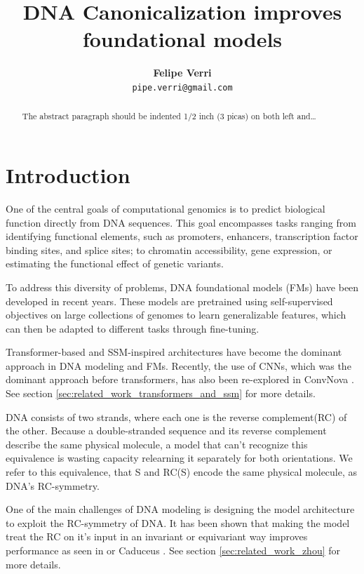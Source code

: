 \documentclass[   ]{article}
\title{DNA Canonicalization improves foundational models}
\author{
    \textbf{Felipe Verri} \\
    \texttt{pipe.verri@gmail.com}\\
    }
\begin{document}
\maketitle

\begin{abstract}
The abstract paragraph should be indented 1/2 inch (3 picas) on both
left and\ldots{}
\end{abstract}

\section{Introduction}\label{introduction}

One of the central goals of computational genomics is to predict
biological function directly from DNA sequences. This goal encompasses
tasks ranging from identifying functional elements, such as
promoters, enhancers, transcription factor binding sites, and splice
sites; to chromatin accessibility, gene expression, or estimating the
functional effect of genetic variants.

To address this diversity of problems, DNA foundational models (FMs)
have been developed in recent years. These models are pretrained using
self-supervised objectives on large collections of genomes to learn
generalizable features, which can then be adapted to different tasks
through fine-tuning.

Transformer-based and SSM-inspired architectures have become the dominant approach in DNA modeling and FMs. Recently, the use of CNNs, which was the dominant approach before transformers, has also been re-explored in ConvNova \citep{boRevisitingConvolutionArchitecture2025}. See section \ref{sec:related_work_transformers_and_ssm} for more details.

DNA consists of two strands, where each one is the reverse complement(RC) of the other. Because a double-stranded sequence and its reverse complement describe the same physical molecule, a model that can't recognize this equivalence is wasting capacity relearning it separately for both orientations. We refer to this equivalence, that S and RC(S) encode the same physical molecule, as DNA's RC-symmetry.

One of the main challenges of DNA modeling is designing the model architecture to exploit the RC-symmetry of DNA. It has been shown that making the model treat the RC on it's input in an invariant or equivariant way improves performance as seen in \citet{zhouBetterUnderstandingReverseComplement2021} or Caduceus \citep{schiffCaduceusBiDirectionalEquivariant2024}. See section \ref{sec:related_work_zhou} for more details.
\end{document}
